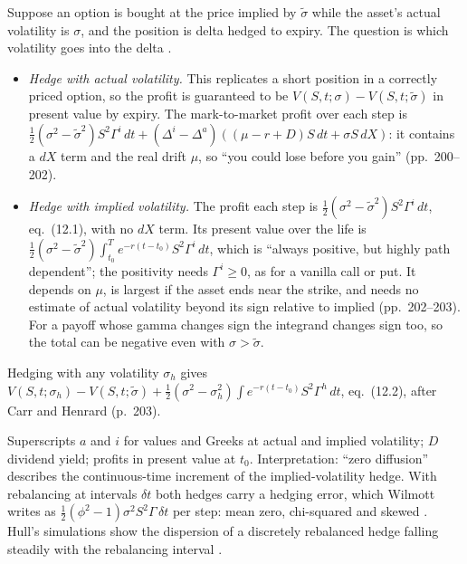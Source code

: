 \begin{qfresult}\label{res:delta-hedging-volatility-mismatch}
 Suppose an option is bought at the price implied by $\tilde\sigma$ while the asset's actual volatility is $\sigma$, and the position is delta hedged to expiry. The question is which volatility goes into the delta \citep[chap.~12, pp.~197--199]{wide-wilmott-pwoqf}.
\begin{itemize}
\item \emph{Hedge with actual volatility.} This replicates a short position in a correctly priced option, so the profit is guaranteed to be $V(S,t;\sigma)-V(S,t;\tilde\sigma)$ in present value by expiry. The mark-to-market profit over each step is $\tfrac12(\sigma^2-\tilde\sigma^2)S^2\Gamma^i\,dt+(\Delta^i-\Delta^a)((\mu-r+D)S\,dt+\sigma S\,dX)$: it contains a $dX$ term and the real drift $\mu$, so ``you could lose before you gain'' (pp.~200--202).
\item \emph{Hedge with implied volatility.} The profit each step is $\tfrac12(\sigma^2-\tilde\sigma^2)S^2\Gamma^i\,dt$, eq.~(12.1), with no $dX$ term. Its present value over the life is $\tfrac12(\sigma^2-\tilde\sigma^2)\int_{t_0}^Te^{-r(t-t_0)}S^2\Gamma^i\,dt$, which is ``always positive, but highly path dependent''; the positivity needs $\Gamma^i\ge0$, as for a vanilla call or put. It depends on $\mu$, is largest if the asset ends near the strike, and needs no estimate of actual volatility beyond its sign relative to implied (pp.~202--203). For a payoff whose gamma changes sign the integrand changes sign too, so the total can be negative even with $\sigma>\tilde\sigma$.
\end{itemize}
Hedging with any volatility $\sigma_h$ gives $V(S,t;\sigma_h)-V(S,t;\tilde\sigma)+\tfrac12(\sigma^2-\sigma_h^2)\int e^{-r(t-t_0)}S^2\Gamma^h\,dt$, eq.~(12.2), after Carr and Henrard (p.~203).

 Superscripts $a$ and $i$ for values and Greeks at actual and implied volatility; $D$ dividend yield; profits in present value at $t_0$. Interpretation: ``zero diffusion'' describes the continuous-time increment of the implied-volatility hedge. With rebalancing at intervals $\delta t$ both hedges carry a hedging error, which Wilmott writes as $\tfrac12(\phi^2-1)\sigma^2S^2\Gamma\,\delta t$ per step: mean zero, chi-squared and skewed \citep[chap.~47, pp.~764--770]{wide-wilmott-pwoqf}. Hull's simulations show the dispersion of a discretely rebalanced hedge falling steadily with the rebalancing interval \citep[chap.~19, sec.~19.4, pp.~425--426]{s7-hulloptions}.


\end{qfresult}
